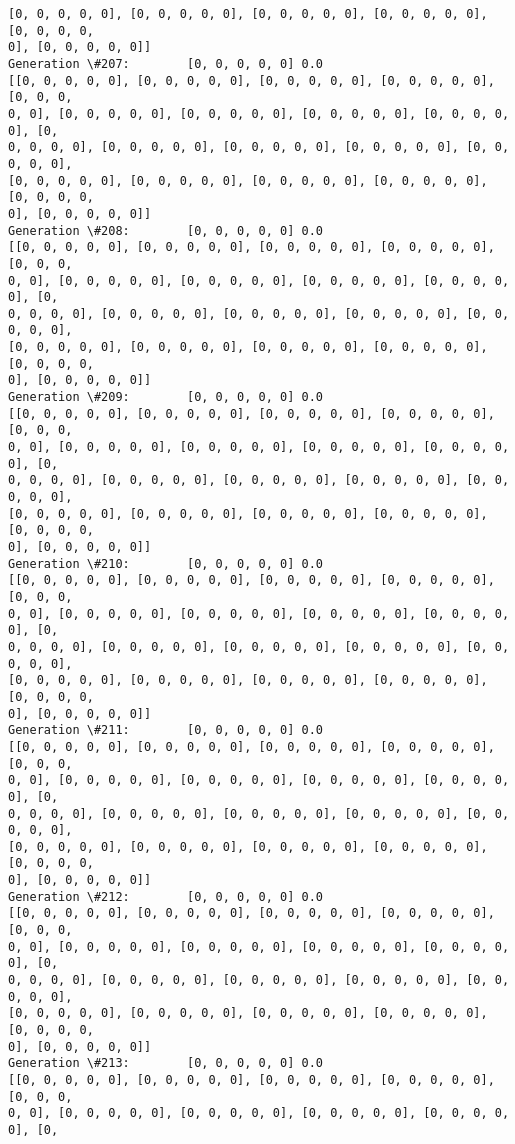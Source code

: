 \documentclass[11pt]{article}
\begin{document}
\begin{Verbatim}[commandchars=\\\{\}]
[0, 0, 0, 0, 0], [0, 0, 0, 0, 0], [0, 0, 0, 0, 0], [0, 0, 0, 0, 0], [0, 0, 0, 0,
0], [0, 0, 0, 0, 0]]
Generation \#207:        [0, 0, 0, 0, 0] 0.0
[[0, 0, 0, 0, 0], [0, 0, 0, 0, 0], [0, 0, 0, 0, 0], [0, 0, 0, 0, 0], [0, 0, 0,
0, 0], [0, 0, 0, 0, 0], [0, 0, 0, 0, 0], [0, 0, 0, 0, 0], [0, 0, 0, 0, 0], [0,
0, 0, 0, 0], [0, 0, 0, 0, 0], [0, 0, 0, 0, 0], [0, 0, 0, 0, 0], [0, 0, 0, 0, 0],
[0, 0, 0, 0, 0], [0, 0, 0, 0, 0], [0, 0, 0, 0, 0], [0, 0, 0, 0, 0], [0, 0, 0, 0,
0], [0, 0, 0, 0, 0]]
Generation \#208:        [0, 0, 0, 0, 0] 0.0
[[0, 0, 0, 0, 0], [0, 0, 0, 0, 0], [0, 0, 0, 0, 0], [0, 0, 0, 0, 0], [0, 0, 0,
0, 0], [0, 0, 0, 0, 0], [0, 0, 0, 0, 0], [0, 0, 0, 0, 0], [0, 0, 0, 0, 0], [0,
0, 0, 0, 0], [0, 0, 0, 0, 0], [0, 0, 0, 0, 0], [0, 0, 0, 0, 0], [0, 0, 0, 0, 0],
[0, 0, 0, 0, 0], [0, 0, 0, 0, 0], [0, 0, 0, 0, 0], [0, 0, 0, 0, 0], [0, 0, 0, 0,
0], [0, 0, 0, 0, 0]]
Generation \#209:        [0, 0, 0, 0, 0] 0.0
[[0, 0, 0, 0, 0], [0, 0, 0, 0, 0], [0, 0, 0, 0, 0], [0, 0, 0, 0, 0], [0, 0, 0,
0, 0], [0, 0, 0, 0, 0], [0, 0, 0, 0, 0], [0, 0, 0, 0, 0], [0, 0, 0, 0, 0], [0,
0, 0, 0, 0], [0, 0, 0, 0, 0], [0, 0, 0, 0, 0], [0, 0, 0, 0, 0], [0, 0, 0, 0, 0],
[0, 0, 0, 0, 0], [0, 0, 0, 0, 0], [0, 0, 0, 0, 0], [0, 0, 0, 0, 0], [0, 0, 0, 0,
0], [0, 0, 0, 0, 0]]
Generation \#210:        [0, 0, 0, 0, 0] 0.0
[[0, 0, 0, 0, 0], [0, 0, 0, 0, 0], [0, 0, 0, 0, 0], [0, 0, 0, 0, 0], [0, 0, 0,
0, 0], [0, 0, 0, 0, 0], [0, 0, 0, 0, 0], [0, 0, 0, 0, 0], [0, 0, 0, 0, 0], [0,
0, 0, 0, 0], [0, 0, 0, 0, 0], [0, 0, 0, 0, 0], [0, 0, 0, 0, 0], [0, 0, 0, 0, 0],
[0, 0, 0, 0, 0], [0, 0, 0, 0, 0], [0, 0, 0, 0, 0], [0, 0, 0, 0, 0], [0, 0, 0, 0,
0], [0, 0, 0, 0, 0]]
Generation \#211:        [0, 0, 0, 0, 0] 0.0
[[0, 0, 0, 0, 0], [0, 0, 0, 0, 0], [0, 0, 0, 0, 0], [0, 0, 0, 0, 0], [0, 0, 0,
0, 0], [0, 0, 0, 0, 0], [0, 0, 0, 0, 0], [0, 0, 0, 0, 0], [0, 0, 0, 0, 0], [0,
0, 0, 0, 0], [0, 0, 0, 0, 0], [0, 0, 0, 0, 0], [0, 0, 0, 0, 0], [0, 0, 0, 0, 0],
[0, 0, 0, 0, 0], [0, 0, 0, 0, 0], [0, 0, 0, 0, 0], [0, 0, 0, 0, 0], [0, 0, 0, 0,
0], [0, 0, 0, 0, 0]]
Generation \#212:        [0, 0, 0, 0, 0] 0.0
[[0, 0, 0, 0, 0], [0, 0, 0, 0, 0], [0, 0, 0, 0, 0], [0, 0, 0, 0, 0], [0, 0, 0,
0, 0], [0, 0, 0, 0, 0], [0, 0, 0, 0, 0], [0, 0, 0, 0, 0], [0, 0, 0, 0, 0], [0,
0, 0, 0, 0], [0, 0, 0, 0, 0], [0, 0, 0, 0, 0], [0, 0, 0, 0, 0], [0, 0, 0, 0, 0],
[0, 0, 0, 0, 0], [0, 0, 0, 0, 0], [0, 0, 0, 0, 0], [0, 0, 0, 0, 0], [0, 0, 0, 0,
0], [0, 0, 0, 0, 0]]
Generation \#213:        [0, 0, 0, 0, 0] 0.0
[[0, 0, 0, 0, 0], [0, 0, 0, 0, 0], [0, 0, 0, 0, 0], [0, 0, 0, 0, 0], [0, 0, 0,
0, 0], [0, 0, 0, 0, 0], [0, 0, 0, 0, 0], [0, 0, 0, 0, 0], [0, 0, 0, 0, 0], [0,

\end{Verbatim}
\end{document}
